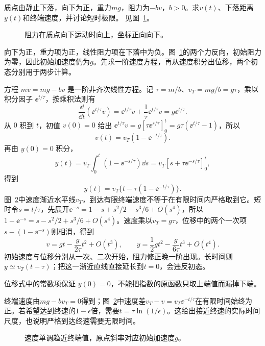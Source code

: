 \begin{exercise}[线性阻力下落]\label{ex:c2-h2}
质点由静止下落，向下为正，重力$mg$，阻力为$-bv$，$b>0$。求$v(t)$、下落距离$y(t)$和终端速度，并讨论短时极限。 见图~\ref{fig:c2-h2-q}。
\end{exercise}

\begin{figure}[H]\centering
{}
\caption{阻力在质点向下运动时向上，坐标正向向下。}\label{fig:c2-h2-q}
\end{figure}
\begin{solution}
向下为正，重力项为正，线性阻力项在下落中为负。图~\ref{fig:c2-h2-q}的两个力反向，初始阻力为零，因此初始加速度仍为$g$。先求一阶速度方程，再从速度积分出位移，两个初态分别用于两步计算。


方程 $m\dot v=mg-bv$ 是一阶非齐次线性方程。记 $\tau=m/b$、$v_T=mg/b=g\tau$，乘以积分因子 $\ee^{t/\tau}$，按乘积法则有
\[
\frac{\dd}{\dd t}(\ee^{t/\tau}v)=\ee^{t/\tau}\dot v+\frac1\tau\ee^{t/\tau}v=g\ee^{t/\tau}.
\]
从 $0$ 积到 $t$，初值 $v(0)=0$ 给出 $\ee^{t/\tau}v=g[\tau\ee^{s/\tau}]_0^t=g\tau(\ee^{t/\tau}-1)$，所以
\[\boxed{v(t)=v_T(1-\ee^{-t/\tau})}.
\]
再由 $y(0)=0$ 积分，
\[
y(t)=v_T\int_0^t(1-\ee^{-s/\tau})\dd s
=v_T[s+\tau\ee^{-s/\tau}]_0^t,
\]
得到
\[\boxed{y(t)=v_T\{t-\tau(1-\ee^{-t/\tau})\}}.
\]
图~\ref{fig:c2-h2-s}中速度渐近水平线$v_T$，到达有限终端速度不等于在有限时间内严格取到它。短时令$s=t/\tau$，先展开$\ee^{-s}=1-s+s^2/2-s^3/6+O(s^4)$，所以$1-\ee^{-s}=s-s^2/2+s^3/6+O(s^4)$。速度乘以$v_T=g\tau$，位移中的两个一次项$s-(1-\ee^{-s})$则相消，得到
\[v=gt-\frac{g}{2\tau}t^2+O(t^3),\qquad
y=\frac12gt^2-\frac{g}{6\tau}t^3+O(t^4).
\]
初始速度与位移分别从一次、二次开始，阻力修正晚一阶出现。长时间则$y\simeq v_T(t-\tau)$；把这一渐近直线直接延长到$t=0$，会违反初态。


位移式中的常数项保证 $y(0)=0$，不能把指数的原函数只取上端值而漏掉下端。

终端速度由$mg-bv_T=0$得到；图~\ref{fig:c2-h2-s}中速度差$v_T-v=v_T\ee^{-t/\tau}$在有限时间始终为正。若希望达到终速的$1-\epsilon$倍，需要$t=\tau\ln(1/\epsilon)$。这给出接近终速的实际时间尺度，也说明严格到达终速需要无限时间。

\begin{figure}[H]\centering
{}
\caption{速度单调趋近终端值，原点斜率对应初始加速度$g$。}\label{fig:c2-h2-s}
\end{figure}
\end{solution}

